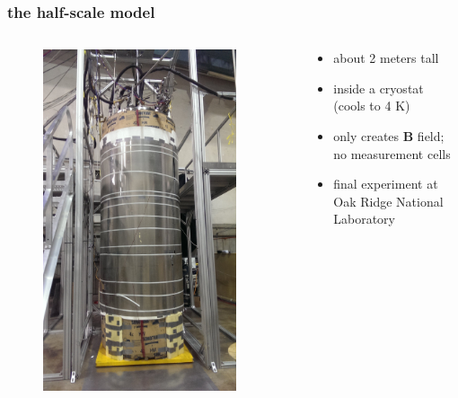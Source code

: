 \documentclass[handout]{beamer}
\renewcommand{\vec}{\mathbf}
\begin{document}
\begin{frame}
\frametitle{the half-scale model}

    \begin{columns}
    
    \begin{column}{0.5\textwidth}
    \begin{figure}
    \includegraphics[width=0.9\textwidth]
    {figures/lab_picture.jpg}
    \end{figure}
    \end{column}
    
    \begin{column}{0.5\textwidth}
    \begin{itemize} \pause
        \item about 2 meters tall \pause
        \item inside a cryostat \\(cools to 4 K) \pause
        \item only creates $\vec{B}$ field;\\ no measurement cells \pause
        \item final experiment at Oak Ridge National Laboratory
    \end{itemize}
    \end{column}


\end{columns}
\end{frame}
\end{document}
